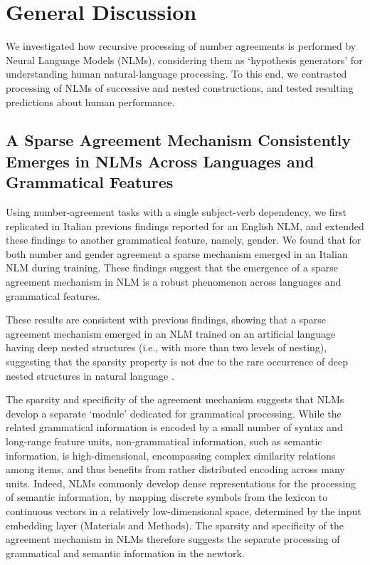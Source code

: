 \section{General Discussion}
We investigated how recursive processing of number agreements is performed by Neural Language Models (NLMs), considering them as `hypothesis generators' for understanding human natural-language processing. To this end, we contrasted processing of NLMs of successive and nested constructions, and tested resulting predictions about human performance. 

\subsection{A Sparse Agreement Mechanism Consistently Emerges in NLMs Across Languages and Grammatical Features}
Using number-agreement tasks with a single subject-verb dependency, we first replicated in Italian previous findings reported for an English NLM, and extended these findings to another grammatical feature, namely, gender. We found that for both number and gender agreement a sparse mechanism emerged in an Italian NLM during training. These findings suggest that the emergence of a sparse agreement mechanism in NLM is a robust phenomenon across languages and grammatical features. 

These results are consistent with previous findings, showing that a sparse agreement mechanism emerged in an NLM trained on an artificial language having deep nested structures (i.e., with more than two levels of nesting), suggesting that the sparsity property is not due to the rare occurrence of deep nested structures in natural language \citep{lakretz2020recursion}. 

The sparsity and specificity of the agreement mechanism suggests that NLMs develop a separate `module' dedicated for grammatical processing. While the related grammatical information is encoded by a small number of syntax and long-range feature units, non-grammatical information, such as semantic information, is high-dimensional, encompassing complex similarity relations among items, and thus benefits from rather distributed encoding across many units. Indeed, NLMs commonly develop dense representations for the processing of semantic information, by mapping discrete symbols from the lexicon to continuous vectors in a relatively low-dimensional space, determined by the input embedding layer (Materials and Methods). The sparsity and specificity of the agreement mechanism in NLMs therefore suggests the separate processing of grammatical and semantic information in the newtork. 

